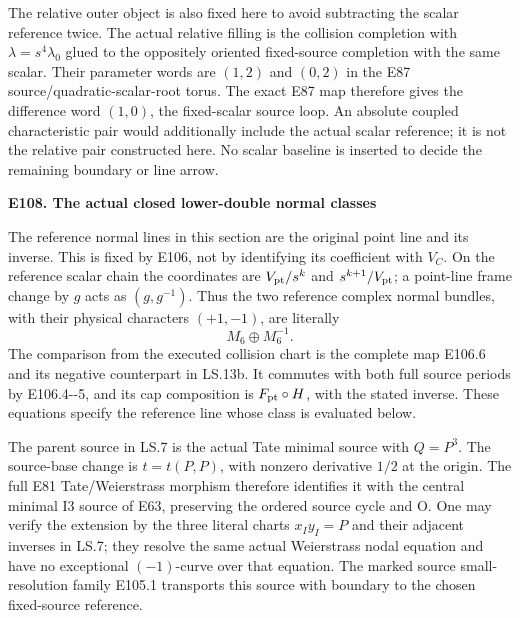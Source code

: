 The relative outer object is also fixed here to avoid subtracting the scalar reference twice. The actual relative filling is the collision completion with \(\lambda=s^4\lambda_0\) glued to the oppositely oriented fixed-source completion with the same scalar. Their parameter words are \((1,2)\) and \((0,2)\) in the E87 source/quadratic-scalar-root torus. The exact E87 map therefore gives the difference word \((1,0)\), the fixed-scalar source loop. An absolute coupled characteristic pair would additionally include the actual scalar reference; it is not the relative pair constructed here. No scalar baseline is inserted to decide the remaining boundary or line arrow.

\par

\medskip\noindent\textbf{E108. The actual closed lower-double normal classes}

\par\nobreak

The reference normal lines in this section are the original point line and its inverse. This is fixed by E106, not by identifying its coefficient with \(V_C\). On the reference scalar chain the coordinates are \(V_{\rm pt}/s^k\) and \(s^{k+1}/V_{\rm pt}\); a point-line frame change by \(g\) acts as \((g,g^{-1})\). Thus the two reference complex normal bundles, with their physical characters \((+1,-1)\), are literally
\[
                      M_6\oplus M_6^{-1}.
 \tag{E108.1}
\]
The comparison from the executed collision chart is the complete map E106.6 and its negative counterpart in LS.13b. It commutes with both full source periods by E106.4-\/-5, and its cap composition is \(F_{\rm pt}\circ H\), with the stated inverse. These equations specify the reference line whose class is evaluated below.

The parent source in LS.7 is the actual Tate minimal source with \(Q=P^3\). The source-base change is \(t=t(P,P)\), with nonzero derivative \(1/2\) at the origin. The full E81 Tate/Weierstrass morphism therefore identifies it with the central minimal I3 source of E63, preserving the ordered source cycle and O. One may verify the extension by the three literal charts \(x_Iy_I=P\) and their adjacent inverses in LS.7; they resolve the same actual Weierstrass nodal equation and have no exceptional \((-1)\)-curve over that equation. The marked source small-resolution family E105.1 transports this source with boundary to the chosen fixed-source reference.

